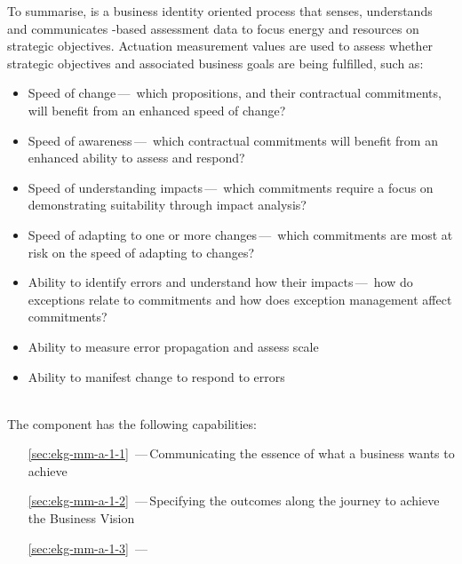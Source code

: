 To summarise, \textbf{} is a business identity oriented process
that senses, understands and communicates -based assessment data to focus energy and
resources on strategic objectives.
Actuation measurement values are used to assess whether strategic objectives and associated business goals are
being fulfilled, such as:

\begin{itemize}
    \item Speed of change\,---\,%
    which propositions, and their contractual commitments, will benefit from an enhanced speed of change?

    \item Speed of awareness\,---\,%
    which contractual commitments will benefit from an enhanced ability to assess and respond?

    \item Speed of understanding impacts\,---\,%
    which commitments require a focus on demonstrating suitability through impact analysis?

    \item Speed of adapting to one or more changes\,---\,%
    which commitments are most at risk on the speed of adapting to changes?

    \item Ability to identify errors and understand how their impacts\,---\,%
          how do exceptions relate to commitments and how does exception management affect commitments?
    \item Ability to measure error propagation and assess scale
    \item Ability to manifest change to respond to errors
\end{itemize}\\[2cm]

The  component has the following capabilities:

\begin{itemize}[leftmargin=.5in]
  \item [\ref{sec:ekg-mm-a-1-1}] \,---\,Communicating the essence of what a business wants to achieve
  \item [\ref{sec:ekg-mm-a-1-2}] \,---\,Specifying the outcomes along the journey to achieve the Business Vision
  \item [\ref{sec:ekg-mm-a-1-3}] \,---\,
\end{itemize}




%
